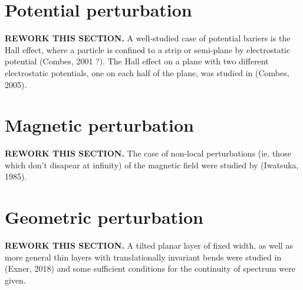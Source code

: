 \section{Potential perturbation}
\textbf{REWORK THIS SECTION.} A well-studied case of potential bariers is the Hall effect, where a particle is confined to a strip or semi-plane by electrostatic potential (Combes, 2001 ?). The Hall effect on a plane with two different electrostatic potentials, one on each half of the plane, was studied in (Combes, 2005).

\section{Magnetic perturbation}
\textbf{REWORK THIS SECTION.} The case of non-local perturbations (ie. those which don't disapear at infinity) of the magnetic field were studied by (Iwatsuka, 1985).

\section{Geometric perturbation}
\textbf{REWORK THIS SECTION.} A tilted planar layer of fixed width, as well as more general thin layers with translationally invariant bends were studied in (Exner, 2018) and some sufficient conditions for the continuity of spectrum were given.
